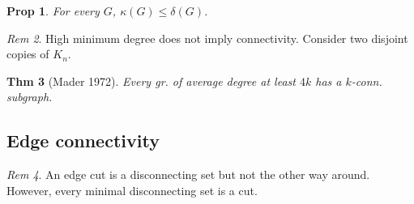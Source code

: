\documentclass[11pt, fleqn, a4paper, landscape]{article}
\theoremstyle{plain} %
\newtheorem{thm}{Thm}
\newtheorem{pro}[thm]{Prop}
\theoremstyle{remark} %
\newtheorem{rem}[thm]{Rem}
\theoremstyle{definition} %
\newtheorem{defi}[thm]{Def}
\begin{document}
\begin{multicols}{5}
\addtocounter{thm}{2}
\begin{pro}
For every $G$, $\kappa (G) \le \delta(G)$.
\end{pro} 

\begin{rem}
High minimum degree does not imply connectivity. Consider two disjoint copies of $K_n$.
\end{rem}
\begin{thm}[Mader 1972]
Every gr. of average degree at least $4k$ has a $k$-conn. subgraph.
\end{thm}

\subsection{Edge connectivity}
%
\addtocounter{thm}{2}
\begin{rem}
An edge cut is a disconnecting set but not the other way around. However, every minimal disconnecting set is a cut.
\end{rem}


\end{multicols}
\end{document}
